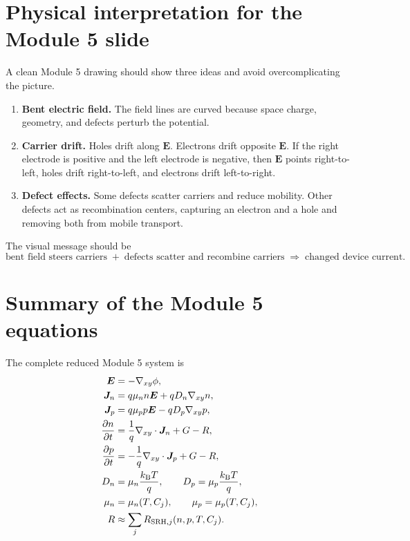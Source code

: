\documentclass[11pt]{article}
\newcommand{\Evec}{\bm{E}}
\newcommand{\Jvec}{\bm{J}}
\newcommand{\gradxy}{\nabla_{xy}}
\newcommand{\divxy}{\nabla_{xy}\cdot}
\begin{document}
\section{Physical interpretation for the Module 5 slide}

A clean Module 5 drawing should show three ideas and avoid overcomplicating the picture.

\begin{enumerate}[label=\textbf{\arabic*.}, leftmargin=2.0em]
\item \textbf{Bent electric field.} The field lines are curved because space charge, geometry, and defects perturb the potential.
\item \textbf{Carrier drift.} Holes drift along \(\Evec\). Electrons drift opposite \(\Evec\). If the right electrode is positive and the left electrode is negative, then \(\Evec\) points right-to-left, holes drift right-to-left, and electrons drift left-to-right.
\item \textbf{Defect effects.} Some defects scatter carriers and reduce mobility. Other defects act as recombination centers, capturing an electron and a hole and removing both from mobile transport.
\end{enumerate}

The visual message should be
\begin{equation}
\boxed{\text{bent field steers carriers} \; + \; \text{defects scatter and recombine carriers} \; \Rightarrow \; \text{changed device current}.}
\end{equation}

\section{Summary of the Module 5 equations}

The complete reduced Module 5 system is
\begin{align}
\Evec&=-\gradxy\phi, \\
\Jvec_n&=q\mu_n n\Evec+qD_n\gradxy n, \\
\Jvec_p&=q\mu_p p\Evec-qD_p\gradxy p, \\
\frac{\partial n}{\partial t}&=\frac{1}{q}\divxy\Jvec_n+G-R, \\
\frac{\partial p}{\partial t}&=-\frac{1}{q}\divxy\Jvec_p+G-R, \\
D_n&=\mu_n\frac{\kB T}{q},\qquad D_p=\mu_p\frac{\kB T}{q}, \\
\mu_n&=\mu_n(T,C_j),\qquad \mu_p=\mu_p(T,C_j), \\
R&\approx \sum_j R_{\mathrm{SRH},j}(n,p,T,C_j).
\end{align}
\end{document}
